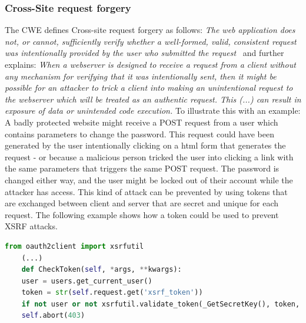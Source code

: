 \documentclass[
a4paper,
pagesize,
pdftex,
12pt,
twoside, %
BCOR=5mm, %
ngerman,
fleqn,
final,
]{scrartcl}
\begin{document}
	\subsubsection{Cross-Site request forgery}
	The CWE defines Cross-site request forgery as follows: \textit{The web application does not, or cannot, sufficiently verify whether a well-formed, valid, consistent request was intentionally provided by the user who submitted the request}~\cite{CommonWeaknessEnumeration.19.9.2019b} and further explains: \textit{When a webserver is designed to receive a request from a client without any mechanism for verifying that it was intentionally sent, then it might be possible for an attacker to trick a client into making an unintentional request to the webserver which will be treated as an authentic request. This (...) can result in exposure of data or unintended code execution.} To illustrate this with an example: A badly protected website might receive a POST request from a user which contains parameters to change the password. This request could have been generated by the user intentionally clicking on a html form that generates the request - or because a malicious person tricked the user into clicking a link with the same parameters that triggers the same POST request. The password is changed either way, and the user might be locked out of their account while the attacker has access. This kind of attack can be prevented by using tokens that are exchanged between client and server that are secret and unique for each request. The following example shows how a token could be used to prevent XSRF attacks.
	\begin{lstlisting}[language=Python, showstringspaces=False]
	from oauth2client import xsrfutil
	(...)
	def CheckToken(self, *args, **kwargs):
	user = users.get_current_user()
	token = str(self.request.get('xsrf_token'))
	if not user or not xsrfutil.validate_token(_GetSecretKey(), token, user.user_id()):
	self.abort(403)
	
	\end{lstlisting}
	
\end{document}
